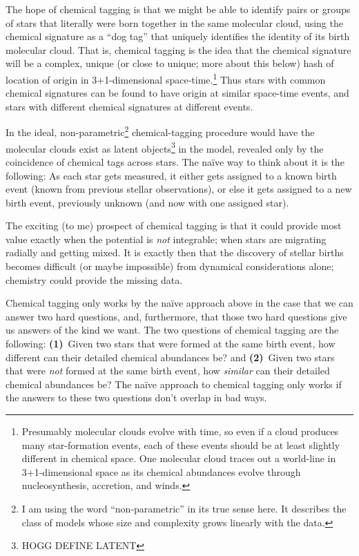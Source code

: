 \documentclass[11pt, letterpaper]{article}
\begin{document}
The hope of chemical tagging is that we might be able to identify
pairs or groups of stars that literally were born together in the same
molecular cloud, using the chemical signature as a ``dog tag'' that
uniquely identifies the identity of its birth molecular cloud. That
is, chemical tagging is the idea that the chemical signature will be a
complex, unique (or close to unique; more about this below) hash of
location of origin in 3+1-dimensional space-time.\footnote{Presumably
  molecular clouds evolve with time, so even if a cloud produces many
  star-formation events, each of these events should be at least
  slightly different in chemical space. One molecular cloud traces out
  a world-line in 3+1-dimensional space as its chemical abundances
  evolve through nucleosynthesis, accretion, and winds.}  Thus stars
with common chemical signatures can be found to have origin at similar
space-time events, and stars with different chemical signatures at
different events.

In the ideal, non-parametric\footnote{I am using the word
  ``non-parametric'' in its true sense here. It describes the class of
  models whose size and complexity grows linearly with the data.}
chemical-tagging procedure would have the molecular clouds exist as
latent objects\footnote{HOGG DEFINE LATENT} in the model, revealed
only by the coincidence of chemical tags across stars. The na\"ive way
to think about it is the following: As each star gets measured, it
either gets assigned to a known birth event (known from previous
stellar observations), or else it gets assigned to a new birth event,
previously unknown (and now with one assigned star).

The exciting (to me) prospect of chemical tagging is that it could
provide most value exactly when the potential is \emph{not}
integrable; when stars are migrating radially and getting mixed.
It is exactly then that the discovery of stellar births becomes
difficult (or maybe impossible) from dynamical considerations alone;
chemistry could provide the missing data.

Chemical tagging only works by the na\"ive approach above in the case that we can
answer two hard questions, and, furthermore, that those two hard
questions give us answers of the kind we want. The two questions of
chemical tagging are the following: \textbf{(1)}~Given two stars that
were formed at the same birth event, how different can their detailed
chemical abundances be? and \textbf{(2)}~Given two stars that were
\emph{not} formed at the same birth event, how \emph{similar} can
their detailed chemical abundances be? The na\"ive approach to
chemical tagging only works if the answers to these two questions
don't overlap in bad ways.
\end{document}
